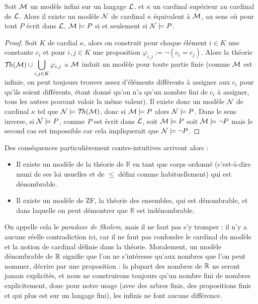 \begin{them}
    Soit $\mathcal M$ un modèle infini sur un langage $\mathcal L$, et $\kappa$ un cardinal supérieur au cardinal de $\mathcal L$. Alors il existe un modèle $\mathcal N$ de cardinal $\kappa$ équivalent à $\mathcal M$, au sens où pour tout $P$ écrit dans $\mathcal L$, $\mathcal M\models P$ si et seulement si $\mathcal N\models P$.
\end{them}

\begin{proof}
    Soit $K$ de cardial $\kappa$, alors on construit pour chaque élément $i\in K$ une constante $c_i$ et pour $i,j \in K$ une proposition $\varphi_{i,j} := \lnot (c_i = c_j)$. Alors la théorie $\mathcal{T}\!h(\mathcal M)\cup\displaystyle{\bigcup_{i,j \in K}\varphi_{i,j}}$ a $\mathcal M$ induit un modèle pour toute partie finie (comme $\mathcal M$ est infinie, on peut toujours trouver assez d'éléments différents à assigner aux $c_i$ pour qu'ils soient différents, étant donné qu'on n'a qu'un nombre fini de $c_i$ à assigner, tous les autres pouvant valoir la même valeur). Il existe donc un modèle $\mathcal N$ de cardinal $\kappa$ tel que $\mathcal N\models \mathcal{T}\!h(\mathcal M)$, donc si $\mathcal M\models P$ alors $\mathcal N\models P$. Dans le sens inverse, si $\mathcal N\models P$, comme $P$ est écrit dans $\mathcal L$, soit $\mathcal M\models P$ soit $\mathcal M\models \lnot P$ mais le second cas est impossible car cela impliquerait que $\mathcal N\models \lnot P$.
\end{proof}

\begin{rmk}
    Des conséquences particulièrement contre-intuitives arrivent alors :
    \begin{itemize}[label=$\bullet$]
        \item Il existe un modèle de la théorie de $\mathbb R$ en tant que corps ordonné (c'est-à-dire muni de ses loi usuelles et de $\leq$ défini comme habituellement) qui est dénombrable.
        \item Il existe un modèle de ZF, la théorie des ensembles, qui est dénombrable, et dans laquelle on peut démontrer que $\mathbb R$ est indénombrable.
    \end{itemize}

    On appelle cela le \textit{paradoxe de Skolem}, mais il ne faut pas s'y tromper : il n'y a aucune réelle contradiction ici, car il ne faut pas confondre le cardinal du modèle et la notion de cardinal définie dans la théorie. Moralement, un modèle dénombrable de $\mathbb{R}$ signifie que l'on ne s'intéresse qu'aux nombres que l'on peut nommer, décrire par une proposition : la plupart des nombres de $\mathbb{R}$ ne seront jamais explicités, et nous ne construirons toujours qu'un nombre fini de nombres explicitement, donc pour notre usage (avec des arbres finis, des propositions finis et qui plus est sur un langage fini), les infinis ne font aucune différence.
\end{rmk}

